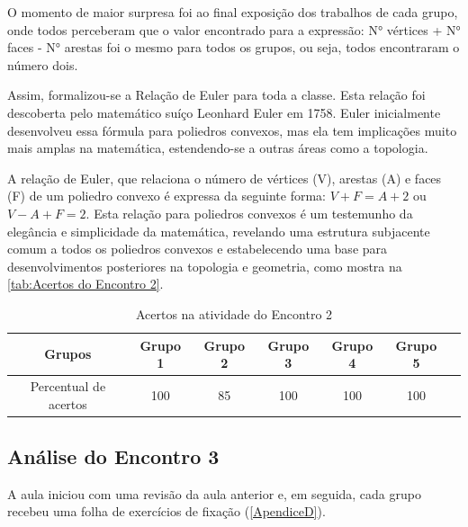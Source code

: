 O momento de maior surpresa foi ao final exposição dos trabalhos de cada grupo, onde todos perceberam que o valor encontrado para a expressão: N° vértices + N° faces - N° arestas foi o mesmo para todos os grupos, ou seja, todos encontraram o número dois.

Assim, formalizou-se a Relação de Euler para toda a classe. Esta relação foi descoberta pelo matemático suíço Leonhard Euler em 1758. Euler inicialmente desenvolveu essa fórmula para poliedros convexos, mas ela tem implicações muito mais amplas na matemática, estendendo-se a outras áreas como a topologia.

A relação de Euler, que relaciona o número de vértices (V), arestas (A) e faces (F) de um poliedro convexo é expressa da seguinte forma: \textcolor[HTML]{0000FF}{$V + F = A + 2$} ou \textcolor[HTML]{0000FF}{$V - A + F = 2$}. Esta relação para poliedros convexos é um testemunho da elegância e simplicidade da matemática, revelando uma estrutura subjacente comum a todos os poliedros convexos e estabelecendo uma base para desenvolvimentos posteriores na topologia e geometria, como mostra na \autoref{tab:Acertos do Encontro 2}.

\begin{table}[htbp] \centering
    \caption{Acertos na atividade do Encontro 2} \label{tab:Acertos do Encontro 2} \begin{tabular}{|c|c|c|c|c|c|c|}
        \hline
        \textbf{Grupos}       & \textbf{Grupo 1} & \textbf{Grupo 2} & \textbf{Grupo 3} & \textbf{Grupo 4} & \textbf{Grupo 5} \\
        \hline
        Percentual de acertos & 100              & 85               & 100              & 100              & 100              \\
        \hline
    \end{tabular}
    \legend{\legendaTabela}
\end{table}

\subsection{Análise do Encontro 3}

A aula iniciou com uma revisão da aula anterior e, em seguida, cada grupo recebeu uma folha de exercícios de fixação (\autoref{ApendiceD}).


